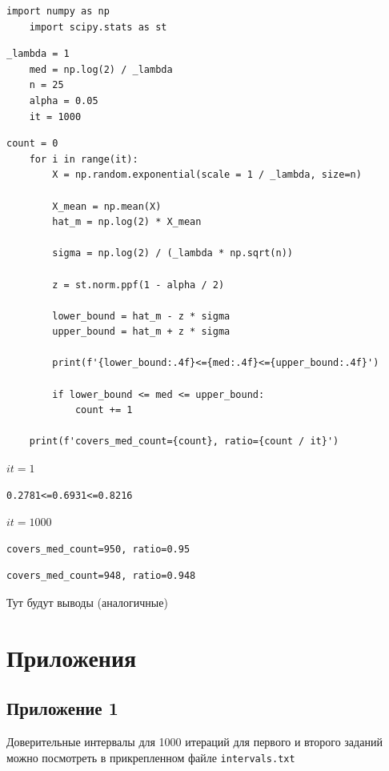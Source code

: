 \documentclass[a4paper, 12pt]{article}
\begin{document}
    \begin{lstlisting}[label=imps2, caption={import}]
    import numpy as np
    import scipy.stats as st
    \end{lstlisting}


    \begin{lstlisting}[label=vars2, caption={pars}]
    _lambda = 1
    med = np.log(2) / _lambda
    n = 25
    alpha = 0.05
    it = 1000
    \end{lstlisting}


    \begin{lstlisting}[label=code2, caption={code2}]
    count = 0
    for i in range(it):
        X = np.random.exponential(scale = 1 / _lambda, size=n)

        X_mean = np.mean(X)
        hat_m = np.log(2) * X_mean

        sigma = np.log(2) / (_lambda * np.sqrt(n))

        z = st.norm.ppf(1 - alpha / 2)

        lower_bound = hat_m - z * sigma
        upper_bound = hat_m + z * sigma

        print(f'{lower_bound:.4f}<={med:.4f}<={upper_bound:.4f}')

        if lower_bound <= med <= upper_bound:
            count += 1

    print(f'covers_med_count={count}, ratio={count / it}')
    \end{lstlisting}


    $it=1$
    \begin{lstlisting}[label=int2, caption={$n=25$}]
    0.2781<=0.6931<=0.8216
    \end{lstlisting}


    $it=1000$
    \begin{lstlisting}[label=n25_2, caption={$n=25$}]
    covers_med_count=950, ratio=0.95
    \end{lstlisting}


    \begin{lstlisting}[label=n10000_2, caption={$n=10000$}]
    covers_med_count=948, ratio=0.948
    \end{lstlisting}


    Тут будут выводы (аналогичные)


    \section{Приложения}
    \subsection{Приложение 1}
    Доверительные интервалы для 1000 итераций для первого и второго заданий можно посмотреть в прикрепленном файле \texttt{intervals.txt}
\end{document}
